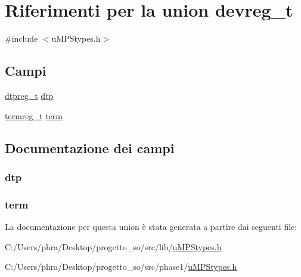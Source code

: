 \hypertarget{uniondevreg__t}{\section{Riferimenti per la union devreg\-\_\-t}
\label{uniondevreg__t}
}


{\ttfamily \#include $<$u\-M\-P\-Stypes.\-h$>$}

\subsection*{Campi}
\begin{DoxyCompactItemize}
\item 
\hyperlink{structdtpreg__t}{dtpreg\-\_\-t} \hyperlink{uniondevreg__t_a78e61f38ebbbb2b669e0cf6d6ea00d77}{dtp}
\item 
\hyperlink{structtermreg__t}{termreg\-\_\-t} \hyperlink{uniondevreg__t_a98298db6115a0ce0138af4474b6b9ad9}{term}
\end{DoxyCompactItemize}


\subsection{Documentazione dei campi}
\hypertarget{uniondevreg__t_a78e61f38ebbbb2b669e0cf6d6ea00d77}{
\subsubsection[{dtp}]{ dtp}}\label{uniondevreg__t_a78e61f38ebbbb2b669e0cf6d6ea00d77}
\hypertarget{uniondevreg__t_a98298db6115a0ce0138af4474b6b9ad9}{
\subsubsection[{term}]{ term}}\label{uniondevreg__t_a98298db6115a0ce0138af4474b6b9ad9}


La documentazione per questa union è stata generata a partire dai seguenti file\-:\begin{DoxyCompactItemize}
\item 
C\-:/\-Users/phra/\-Desktop/progetto\-\_\-so/src/lib/\hyperlink{lib_2u_m_p_stypes_8h}{u\-M\-P\-Stypes.\-h}\item 
C\-:/\-Users/phra/\-Desktop/progetto\-\_\-so/src/phase1/\hyperlink{phase1_2u_m_p_stypes_8h}{u\-M\-P\-Stypes.\-h}\end{DoxyCompactItemize}
